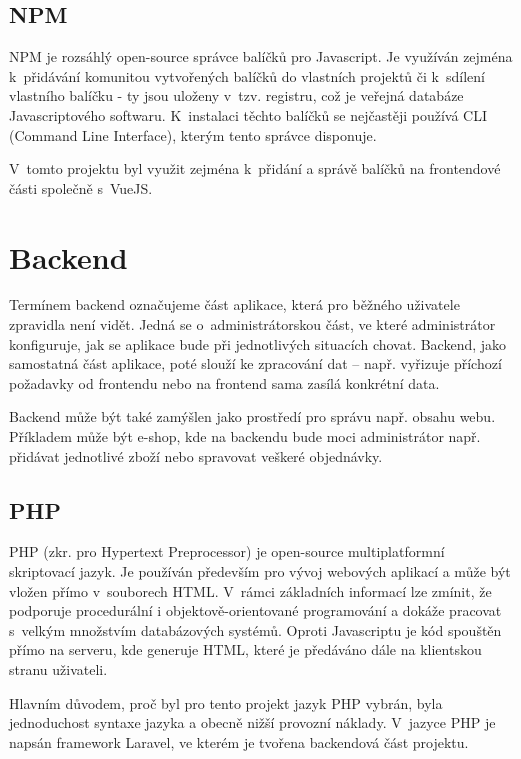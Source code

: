 	\subsection{NPM}\label{sec:npm}
	NPM je rozsáhlý open-source správce balíčků pro Javascript. Je využíván zejména k~přidávání komunitou vytvořených balíčků do vlastních projektů či k~sdílení vlastního balíčku - ty jsou uloženy v~tzv. registru, což je veřejná databáze Javascriptového softwaru. K~instalaci těchto balíčků se nejčastěji používá CLI (Command Line Interface), kterým tento správce disponuje. \cite{NPM}
	
	V~tomto projektu byl využit zejména k~přidání a správě balíčků na frontendové části společně s~VueJS.

\section{Backend}
Termínem backend označujeme část aplikace, která pro běžného uživatele zpravidla není vidět. Jedná se o~administrátorskou část, ve které administrátor konfiguruje, jak se aplikace bude při jednotlivých situacích chovat. Backend, jako samostatná část aplikace, poté slouží ke zpracování dat – např. vyřizuje příchozí požadavky od frontendu nebo na frontend sama zasílá konkrétní data.

Backend může být také zamýšlen jako prostředí pro správu např. obsahu webu. Příkladem může být e-shop, kde na backendu bude moci administrátor např. přidávat jednotlivé zboží nebo spravovat veškeré objednávky.  \cite{BE1}\cite{BE2}
	
	\subsection{PHP}
	PHP (zkr. pro Hypertext Preprocessor) je open-source multiplatformní skriptovací jazyk. Je používán především pro vývoj webových aplikací a může být vložen přímo v~souborech HTML. V~rámci základních informací lze zmínit, že podporuje procedurální i objektově-orientované programování a dokáže pracovat s~velkým množstvím databázových systémů. Oproti Javascriptu je kód spouštěn přímo na serveru, kde generuje HTML, které je předáváno dále na klientskou stranu uživateli. \cite{PHP1}\cite{PHP2}
	
	Hlavním důvodem, proč byl pro tento projekt jazyk PHP vybrán, byla jednoduchost syntaxe jazyka a obecně nižší provozní náklady. V~jazyce PHP je napsán framework Laravel, ve kterém je tvořena backendová část projektu.
	
